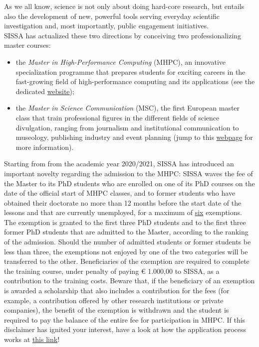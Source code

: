 \documentclass{sissavademecum}
\begin{document}
As we all know, science is not only about doing hard-core research, but entails also the development of new, powerful tools serving everyday scientific investigation and, most importantly, public engagement initiatives. \\
SISSA has actualized these two directions by conceiving two professionalizing master courses:
\begin{itemize}
    \item the \textit{Master in High-Performance Computing} (MHPC), an innovative specialization programme that prepares students for exciting careers in the fast-growing field of high-performance computing and its applications (see the dedicated \href{https://www.mhpc.it/}{website});
    \item the \textit{Master in Science Communication} (MSC), the first European master class that train professional figures in the different fields of science divulgation, ranging from journalism and institutional communication to museology, publishing industry and event planning (jump to this \href{https://mcs.sissa.it/}{webpage} for more information).
\end{itemize}
Starting from from the academic year 2020/2021, SISSA has introduced an important novelty regarding the admission to the MHPC: SISSA waves the fee of the Master to its PhD students who are enrolled on one of its PhD courses on the date of the official start of MHPC classes, and to former students who have obtained their doctorate no more than 12 months before the start date of the lessons and that are currently unemployed, for a maximum of \underline{six} exemptions. The exemption is granted to the first three PhD students and to the first three former PhD students that are admitted to the Master, according to the ranking of the admission. Should the number of admitted students or former students be less than three, the exemptions not enjoyed by one of the two categories will be transferred to the other. Beneficiaries of the exemption are required to complete the training course, under penalty of paying € 1.000,00 to SISSA, as a contribution to the training costs. Beware that, if the beneficiary of an exemption is awarded a scholarship that also includes a contribution for the fees (for example, a contribution offered by other research institutions or private companies), the benefit of the exemption is withdrawn and the student is required to pay the balance of the entire fee for participation in MHPC. If this disclaimer has ignited your interest, have a look at how the application process works at \href{https://www.mhpc.it/how-apply}{this link}!
\end{document}
